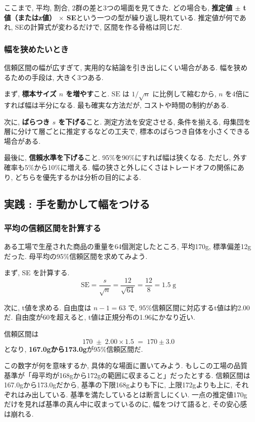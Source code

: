 ここまで, 平均, 割合, 2群の差と3つの場面を見てきた.
どの場合も, \textbf{推定値 $\pm$ t値（またはz値） $\times$ SE}という一つの型が繰り返し現れている.
推定値が何であれ, SEの計算式が変わるだけで, 区間を作る骨格は同じだ.

\subsubsection{幅を狭めたいとき}

信頼区間の幅が広すぎて, 実用的な結論を引き出しにくい場合がある.
幅を狭めるための手段は, 大きく3つある.

まず, \textbf{標本サイズ $n$ を増やす}こと.
$\mathrm{SE}$ は $1/\sqrt{n}$ に比例して縮むから, $n$ を4倍にすれば幅は半分になる.
最も確実な方法だが, コストや時間の制約がある.

次に, \textbf{ばらつき $s$ を下げる}こと.
測定方法を安定させる, 条件を揃える, 母集団を層に分けて層ごとに推定するなどの工夫で, 標本のばらつき自体を小さくできる場合がある.

最後に, \textbf{信頼水準を下げる}こと.
95\%を90\%にすれば幅は狭くなる.
ただし, 外す確率も5\%から10\%に増える.
幅の狭さと外しにくさはトレードオフの関係にあり, どちらを優先するかは分析の目的による.


\subsection{実践 : 手を動かして幅をつける}

\subsubsection{平均の信頼区間を計算する}

ある工場で生産された商品の重量を64個測定したところ, 平均170g, 標準偏差12gだった.
母平均の95\%信頼区間を求めてみよう.

まず, SE を計算する.
\[
  \mathrm{SE} = \frac{s}{\sqrt{n}} = \frac{12}{\sqrt{64}} = \frac{12}{8} = 1.5 \;\text{g}
\]

次に, t値を求める.
自由度は $n - 1 = 63$ で, 95\%信頼区間に対応するt値は約2.00だ.
自由度が60を超えると, t値は正規分布の1.96にかなり近い.

信頼区間は
\[
  170 \;\pm\; 2.00 \times 1.5 \;=\; 170 \pm 3.0
\]
となり, \textbf{167.0gから173.0g}が95\%信頼区間だ.

この数字が何を意味するか, 具体的な場面に置いてみよう.
もしこの工場の品質基準が「母平均が168gから172gの範囲に収まること」だったとする.
信頼区間は167.0gから173.0gだから, 基準の下限168gよりも下に, 上限172gよりも上に, それぞれはみ出している.
基準を満たしているとは断言しにくい.
一点の推定値170gだけを見れば基準の真ん中に収まっているのに, 幅をつけて語ると, その安心感は崩れる.


